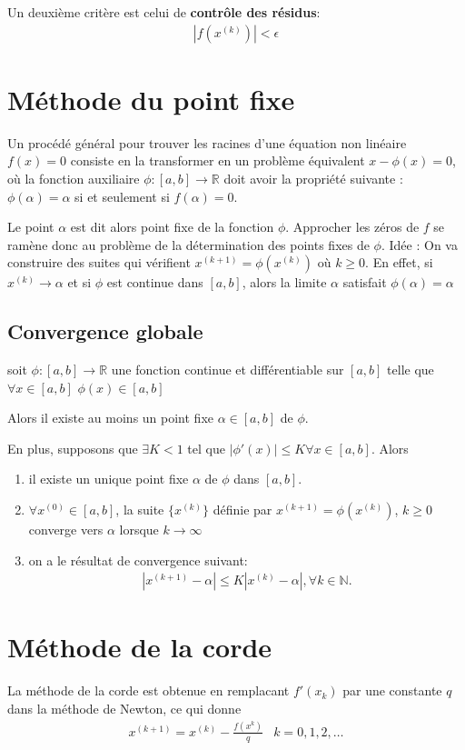 Un deuxième critère est celui de \textbf{contrôle des résidus}:
\begin{eqnarray}
	|f(x^{(k)})|<\epsilon
\end{eqnarray}

\section{Méthode du point fixe}
Un procédé général pour trouver les racines d’une équation non linéaire 
$f(x)= 0$ consiste en la transformer en un problème équivalent $x-\phi(x) = 0$, 
où la fonction auxiliaire $\phi : [a, b] \rightarrow\mathbb R$ doit avoir la propriété suivante : 
$\phi(\alpha)=\alpha$ si et seulement si $f (\alpha) = 0.$ 

Le point $\alpha$ est dit alors point fixe de la fonction $\phi$. Approcher les zéros de $f$ se 
ramène donc au problème de la détermination des points fixes de $\phi$. 
Idée : On va construire des suites qui vérifient $x^{(k+1)} = \phi(x^{(k)})$ où $k \geq 0$. En 
effet, si $x^{(k)}\rightarrow\alpha$ et si $\phi$ est continue dans $[a, b]$, alors la limite $\alpha$ satisfait 
$\phi(\alpha)=\alpha$

\subsection{Convergence globale}
soit $\phi : [a, b] \rightarrow\mathbb R$ une fonction continue et différentiable sur $[a, b]$ telle que 
$\forall x \in [a, b]$
$\phi(x) \in [a, b]$

Alors il existe au moins un point fixe $\alpha \in[a,b]$ de $\phi$.

En plus, supposons que 
$\exists K < 1$ tel que $|\phi'(x)| \leq K \forall x \in [a, b].$ 
Alors 
\begin{enumerate}
	\item il existe un unique point fixe $\alpha$ de $\phi$ dans $[a, b]$.
	\item $\forall x^{(0)} \in [a, b]$, la suite $\{x^{(k)} \}$ définie par $x^{(k+1)} = \phi(x^{(k)})$, $k \geq 0$ converge vers $\alpha$ lorsque $k\rightarrow\infty$
	\item on a le résultat de convergence suivant: 
	\begin{eqnarray}
		| x^{(k+1)} - \alpha |\leq K | x^{(k)} - \alpha |, \forall k \in\mathbb N.
	\end{eqnarray}
\end{enumerate} 

\section{Méthode de la corde}
La méthode de la corde est obtenue en remplacant $f'(x_k)$ par une constante $q$ dans la méthode de Newton, ce qui donne
\begin{eqnarray}
	x^{(k+1)}=x^{(k)}-\frac{f(x^k)}{q}&k=0,1,2,\dots
\end{eqnarray}